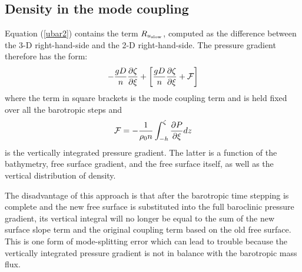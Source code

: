 \subsection{Density in the mode coupling}

Equation (\ref{ubar2}) contains the term $R_{u_{\rm slow}}$,
computed as the difference between the 3-D right-hand-side and the
2-D right-hand-side. The pressure gradient therefore has the form:
\begin{equation}
   -\frac{g D}{n} \frac{\partial \zeta}{\partial \xi} +
   \left[\frac{g D}{n} \frac{\partial \zeta}{\partial \xi} + {\cal F}
   \right]
\end{equation}
where the term in square brackets is the mode coupling term and is
held fixed over all the barotropic steps and
\begin{equation}
  {\cal F} = - \frac{1}{\rho_0 n} \int_{-h}^\zeta \frac{\partial
  P}{\partial \xi} dz
\end{equation}
is the vertically integrated pressure gradient. The latter is a function
of the bathymetry, free surface gradient, and the free surface itself,
as well as the vertical distribution of density.

The disadvantage of this approach is that after the barotropic time
stepping is complete and the new free surface is substituted into
the full baroclinic pressure gradient, its vertical integral will
no longer be equal to the sum of the new surface slope term and the
original coupling term based on the old free surface. This is one
form of mode-splitting error which can lead to trouble because the
vertically integrated pressure gradient is not in balance with the
barotropic mass flux.

